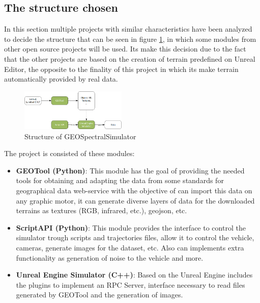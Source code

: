 \documentclass[10pt,a4paper,twocolumn,twoside]{article}
\begin{document}
\subsection{The structure chosen}

In this section multiple projects with similar characteristics have been analyzed to decide the structure that can be seen in figure \ref{fig-dronsimulatormodules}, in which some modules from other open source projects will be used. Its make this decision due to the fact that the other projects are based on the creation of terrain predefined on Unreal Editor, the opposite to the finality of this project in which its make terrain automatically provided by real data.

\begin{figure}[!h]
\centering
  	\includegraphics[width=0.45\textwidth]{structuretfg}
	\caption{Structure of GEOSpectralSimulator}
	\label{fig-dronsimulatormodules}
\end{figure}

The project is consisted of these modules:

\begin{itemize}
  \item \textbf{GEOTool (Python)}: This module has the goal of providing the needed tools for obtaining and adapting the data from some standards for geographical data web-service with the objective of can import this data on any graphic motor, it can generate diverse layers of data for the downloaded terrains as textures (RGB, infrared, etc.), geojson, etc. 
  
  \item \textbf{ScriptAPI (Python)}: This module provides the interface to control the simulator trough scripts and trajectories files, allow it to control the vehicle, cameras, generate images for the dataset, etc. Also can implements extra functionality as generation of noise to the vehicle and more.
  
  \item \textbf{Unreal Engine Simulator (C++)}: Based on the Unreal Engine includes the plugins to implement an RPC Server, interface necessary to read files generated by GEOTool and the generation of images.
\end{itemize}
\end{document}
